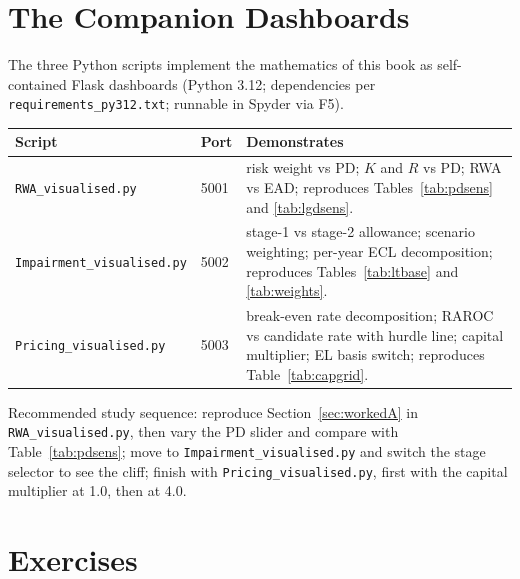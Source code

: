 \documentclass[11pt,a4paper]{report}
\theoremstyle{definition}
\theoremstyle{plain}
\begin{document}
\chapter{The Companion Dashboards}
\label{chap:dashboards}

The three Python scripts implement the mathematics of this book as
self-contained Flask dashboards (Python 3.12; dependencies per
\texttt{requirements\_py312.txt}; runnable in Spyder via F5).

\begin{center}
\begin{tabular}{llp{78mm}}
\toprule
Script & Port & Demonstrates\\
\midrule
\texttt{RWA\_visualised.py} & 5001 &
risk weight vs PD; $K$ and $R$ vs PD; RWA vs EAD;
reproduces Tables~\ref{tab:pdsens} and \ref{tab:lgdsens}.\\
\texttt{Impairment\_visualised.py} & 5002 &
stage-1 vs stage-2 allowance; scenario weighting; per-year ECL
decomposition; reproduces Tables~\ref{tab:ltbase} and \ref{tab:weights}.\\
\texttt{Pricing\_visualised.py} & 5003 &
break-even rate decomposition; RAROC vs candidate rate with hurdle
line; capital multiplier; EL basis switch; reproduces
Table~\ref{tab:capgrid}.\\
\bottomrule
\end{tabular}
\end{center}

Recommended study sequence: reproduce Section~\ref{sec:workedA} in
\texttt{RWA\_visualised.py}, then vary the PD slider and compare with
Table~\ref{tab:pdsens}; move to
\texttt{Impairment\_visualised.py} and switch the stage selector to
see the cliff; finish with \texttt{Pricing\_visualised.py}, first with
the capital multiplier at 1.0, then at 4.0.

\chapter{Exercises}
\end{document}
